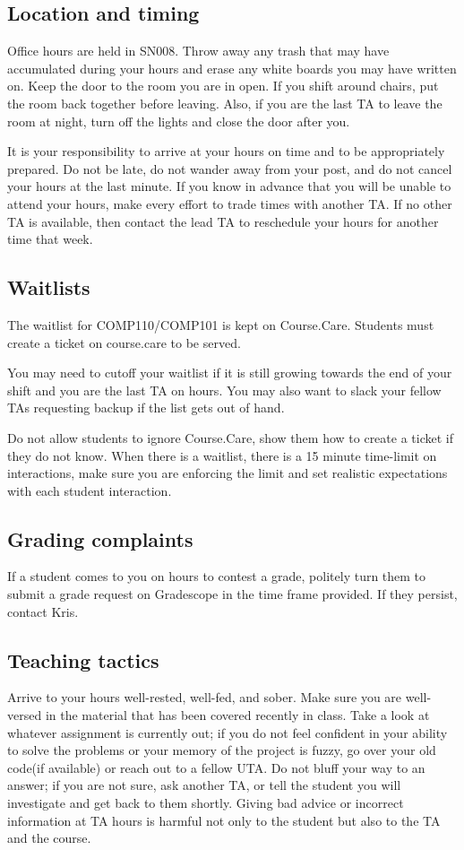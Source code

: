 \documentclass[a4paper]{article}
\begin{document}
\subsection{Location and timing}
Office hours are held in SN008. Throw away any trash that may have accumulated during your hours and erase any white boards you may have written on. Keep the door to the room you are in open. If you shift around chairs, put the room back together before leaving. Also, if you are the last TA to leave the room at night, turn off the lights and close the door after you. 
\begin{flushleft}
It is your responsibility to arrive at your hours on time and to be appropriately prepared. Do
not be late, do not wander away from your post, and do not cancel your hours at the last
minute. If you know in advance that you will be unable to attend your hours, make every
effort to trade times with another TA. If no other TA is available, then contact the lead TA
to reschedule your hours for another time that week. 
\end{flushleft}
\subsection{Waitlists}
The waitlist for COMP110/COMP101 is kept on Course.Care. Students must create a ticket on course.care to be served. 
\begin{flushleft}
You may need to cutoff your waitlist if it is still growing towards the end of your shift and you are the last TA on hours. You may also want to slack your fellow TAs requesting backup if the list gets out of hand. 
\end{flushleft}
\begin{flushleft}
Do not allow students to ignore Course.Care, show them how to create a ticket if they do not know. 
When there is a waitlist, there is a 15 minute time-limit on interactions, make sure you are enforcing the limit and set realistic expectations with each student interaction. 
\end{flushleft}
\subsection{Grading complaints}
If a student comes to you on hours to contest a grade, politely turn them to submit a grade request on Gradescope in the time frame provided. If they persist, contact Kris. 
\subsection{Teaching tactics}
Arrive to your hours well-rested, well-fed, and sober. Make sure you are well-versed in the
material that has been covered recently in class. Take a look at whatever assignment is
currently out; if you do not feel confident in your ability to solve the problems or your
memory of the project is fuzzy, go over your old code(if available) or reach out to a fellow UTA. Do not bluff your
way to an answer; if you are not sure, ask another TA, or tell the student you will investigate
and get back to them shortly. Giving bad advice or incorrect information at TA hours is
harmful not only to the student but also to the TA and the course. 
\end{document}
